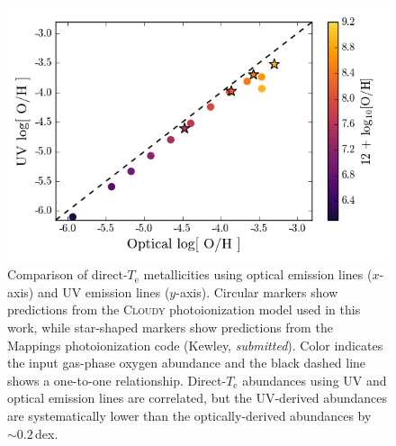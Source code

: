\documentclass[preprint2]{aastex62}
\newcommand{\Cloudy}{\textsc{Cloudy}\xspace}
\newcommand{\Te}{\ensuremath{T_{\mathrm{e}}}\xspace}
\begin{document}
\begin{figure}
  \begin{center}
    \includegraphics[width=\linewidth]{figs/f1.png}
    \caption{Comparison of direct-\Te metallicities using optical emission lines ($x$-axis) and UV emission lines ($y$-axis). Circular markers show predictions from the \Cloudy photoionization model used in this work, while star-shaped markers show predictions from the {\sc Mappings} photoionization code (Kewley, \emph{submitted}). Color indicates the input gas-phase oxygen abundance and the black dashed line shows a one-to-one relationship. Direct-\Te abundances using UV and optical emission lines are correlated, but the UV-derived abundances are systematically lower than the optically-derived abundances by $\sim0.2$\,dex.}
    \label{fig:UVoptZ}
  \end{center}
\end{figure}
\end{document}
